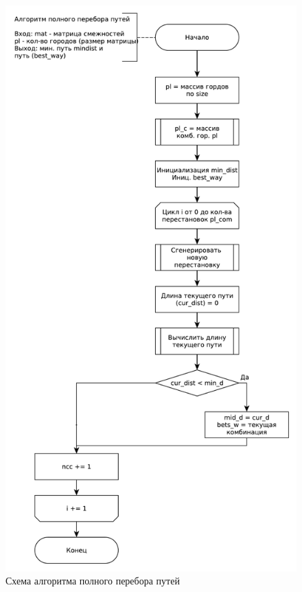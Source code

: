 \begin{figure}[ht!]
	\centering
	\includegraphics[width=0.7\linewidth]{assets/graphs/perebor.pdf}
	\caption{Схема алгоритма полного перебора путей}
	\label{fig:full_comb}
\end{figure}



